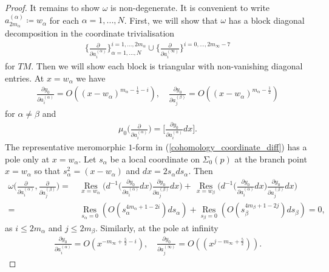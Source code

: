 \documentclass[a4paper,12pt,reqno]{amsart}
\numberwithin{equation}{section}
\numberwithin{counter2}{section}
\begin{document}
 \begin{proof} 
 It remains to show $\omega$ is non-degenerate.  It is convenient to write $a_{2m_\alpha}^{(\alpha)} \coloneqq w_\alpha$ for each $\alpha = 1,...,N$.  First,  we will show that $\omega$ has a block diagonal decomposition in the coordinate trivialisation
\begin{align}
\bigg\{ \frac{\partial}{\partial a_{i}^{(\alpha)}} \bigg\}_{\alpha = 1,...,N}^{i = 1,...,2m_\alpha} \cup \bigg\{ \frac{\partial}{\partial a_{i}^{(\infty)}} \bigg\}^{i = 0,...,2m_\infty - 7}
\end{align}
for $TM$.  
Then we will show each block is triangular with non-vanishing diagonal entries.  
 At $x = w_\alpha$ we have
\begin{align}\label{order_diff_1}
\frac{\partial y_0}{\partial a_i^{(\alpha)}} = O((x-w_\alpha)^{m_\alpha - \frac{1}{2} - i}),  \quad 
\frac{\partial y_0}{\partial a_j^{(\beta)}} = O((x-w_\alpha)^{m_\alpha - \frac{1}{2}}) 
\end{align}
for $\alpha \ne \beta$ and 
\begin{align}\label{cohomology_coordinate_diff}
\mu_0\bigg(\frac{\partial}{\partial a_i^{(\alpha)}}  \bigg) = \Bigg[ \frac{\partial y_0}{\partial a_i^{(\alpha)}} dx \Bigg] .  
\end{align}
The representative meromorphic $1$-form in (\ref{cohomology_coordinate_diff}) has a pole only at $x = w_\alpha$.  Let $s_\alpha$ be a local coordinate on $\Sigma_0(p)$ at the branch point $x = w_\alpha$ so that $s_\alpha^2 = (x-w_\alpha)$ and $dx = 2s_\alpha ds_\alpha$.  Then 
\begin{align}
\omega \bigg(\frac{\partial }{\partial a_i^{(\alpha)}},  \frac{\partial }{\partial a_j^{(\beta)}} \bigg) = \,  &\underset{x = w_\alpha}{\operatorname{Res}} \bigg( d^{-1} \bigg( \frac{\partial y_0}{\partial a_i^{(\alpha)}}  dx \bigg) \frac{\partial y_0}{\partial a_j^{(\beta)}} dx \bigg) \nonumber +  \,  \underset{x = w_\beta}{\operatorname{Res}} \bigg( d^{-1} \bigg( \frac{\partial y_0}{\partial a_i^{(\alpha)}}  dx \bigg)  \frac{\partial y_0}{\partial a_j^{(\beta)}} dx \bigg) \nonumber \\
= \,  & \underset{s_\alpha = 0}{\operatorname{Res}}(O(s_\alpha^{4m_\alpha+1-2i}) ds_\alpha) +  \underset{s_\beta = 0}{\operatorname{Res}}(O(s_\beta^{4m_\beta+1-2j}) ds_\beta) = 0, 
\end{align}
as $i \le 2m_\alpha$ and  $j \le 2m_\beta$.  Similarly,  at the pole at infinity
\begin{align}\label{order_diff_inf_1}
\frac{\partial y_0}{\partial a_i^{(\alpha)}} = O(x^{-m_\infty+\frac{5}{2}-i}),  \quad \frac{\partial y_0}{\partial a_j^{(\infty)}} = O((x^{j-m_\infty+\frac{5}{2}})).

\end{align}
\end{proof}
\end{document}
